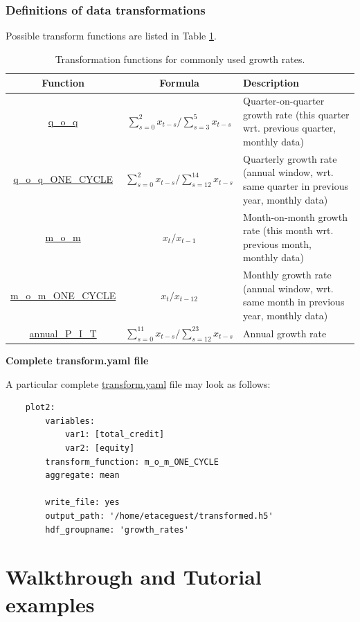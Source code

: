 \documentclass[10pt,a4paper]{article}
\begin{document}
\subsubsection{Definitions of data transformations}
Possible transform functions are listed in Table \ref{Table: Transformation}.

\begin{table}[hbt!]
\label{Table: Transformation}
\begin{tabular}{|c|c|l|}
\hline \hline 
Function & Formula & Description\\
\hline 
\url{q_o_q} & $\sum_{s=0}^2 x_{t-s}/\sum_{s=3}^5 x_{t-s}$ & \parbox{7cm}{Quarter-on-quarter growth rate (this quarter wrt. previous quarter, monthly data)} \\ 
\hline 
\url{q_o_q_ONE_CYCLE} & $\sum_{s=0}^2 x_{t-s}/\sum_{s=12}^{14} x_{t-s}$ & \parbox{7cm}{Quarterly growth rate (annual window, wrt. same quarter in previous year, monthly data)} \\ 
\hline 
\url{m_o_m} & $x_{t}/x_{t-1}$ &  \parbox{7cm}{Month-on-month growth rate (this month wrt. previous month, monthly data)} \\ 
\hline 
\url{m_o_m_ONE_CYCLE} & $x_{t}/x_{t-12}$ & \parbox{7cm}{Monthly growth rate (annual window,  wrt. same month in previous year, monthly data)} \\ 
\hline 
\url{annual_P_I_T} & $\sum_{s=0}^{11} x_{t-s}/\sum_{s=12}^{23} x_{t-s}$ & \parbox{7cm}{Annual growth rate} \\ 
\hline 
\end{tabular} 
\caption{Transformation functions for commonly used growth rates.}
\end{table}


\bigskip
\textbf{Complete transform.yaml file}

A particular complete \url{transform.yaml} file may look as follows:
\begin{lstlisting}
    plot2:
        variables: 
            var1: [total_credit]
            var2: [equity]       
        transform_function: m_o_m_ONE_CYCLE
        aggregate: mean    
     
        write_file: yes
        output_path: '/home/etaceguest/transformed.h5'
        hdf_groupname: 'growth_rates'
\end{lstlisting}


\clearpage
\section{Walkthrough and Tutorial examples}
\label{Section:2}
\end{document}
